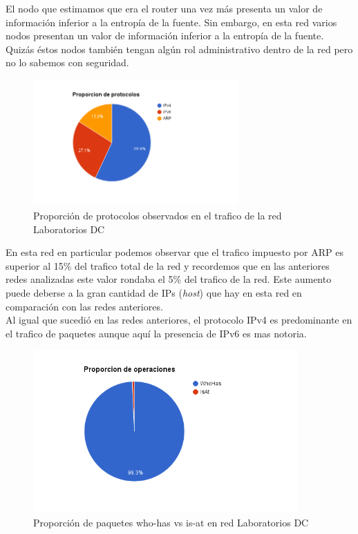 El nodo que estimamos que era el router una vez más presenta un valor de información inferior a la entropía de la fuente. Sin embargo, en esta red varios nodos presentan un valor de información
inferior a la entropía de la fuente. Quizás éstos nodos también tengan algún rol administrativo dentro de la red pero no lo sabemos con seguridad.

\begin{figure}[H]
  \centering
    \includegraphics[width=0.7\textwidth]{imagenes/labosDC/proporcion_protocolos.png}
  \caption{Proporción de protocolos observados en el trafico de la red Laboratorios DC}
  \label{fig:ejemplo}
\end{figure}

En esta red en particular podemos observar que el trafico impuesto por ARP es superior al 15\% del trafico total de la red y recordemos que en las anteriores redes analizadas este valor rondaba el 5\% del trafico de la red. Este aumento puede deberse a la gran cantidad de IPs (\textit{host}) que hay en esta red en comparación con las redes anteriores.\\
Al igual que sucedió en las redes anteriores, el protocolo IPv4 es predominante en el trafico de paquetes aunque aquí la presencia de IPv6 es mas notoria.

\begin{figure}[H]
  \centering
    \includegraphics[width=0.9\textwidth]{imagenes/labosDC/proporcion_paquetes_arp.png}
  \caption{Proporción de paquetes who-has vs is-at en red Laboratorios DC}
  \label{fig:ejemplo}
\end{figure}

